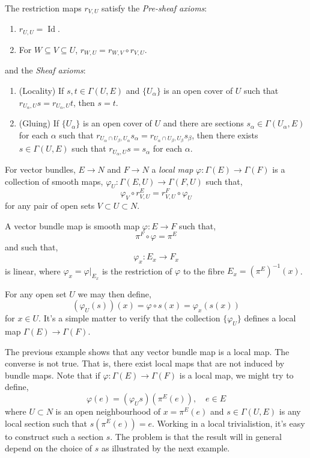 \documentclass{amsart}
\begin{document}
\begin{rem}
The restriction maps \(r_{V,U}\) satisfy the \emph{Pre-sheaf axioms}:
\begin{enumerate}
\item \(r_{U,U} = \operatorname{Id}\).
\item For \(W \subseteq V \subseteq U\), \(r_{W,U} = r_{W,V} \circ r_{V,U}\).
\end{enumerate}
and the \emph{Sheaf axioms}:
\begin{enumerate}
\item (Locality) If \(s, t \in \Gamma(U, E)\) and \(\{U_{\alpha}\}\) is an open cover of \(U\) such that \(r_{U_{\alpha},U} s = r_{U_{\alpha},U} t\), then \(s = t\).
\item (Gluing) If \(\{U_{\alpha}\}\) is an open cover of \(U\) and there are sections \(s_{\alpha} \in \Gamma(U_{\alpha}, E)\) for each \(\alpha\) such that \(r_{U_{\alpha} \cap U_{\beta},U_{\alpha}} s_{\alpha} = r_{U_{\alpha} \cap U_{\beta},U_{\beta}} s_{\beta}\), then there exists \(s \in \Gamma(U, E)\) such that \(r_{U_{\alpha},U} s = s_{\alpha}\) for each \(\alpha\).
\end{enumerate}
\end{rem}

\begin{defn}
For vector bundles, \(E \to N\) and \(F \to N\) a \emph{local map} \(\varphi : \Gamma(E) \to \Gamma(F)\) is a collection of smooth maps, \(\varphi_U : \Gamma(E, U) \to \Gamma(F, U)\) such that,
\[
\varphi_V \circ r^E_{V, U} = r^F_{V, U} \circ \varphi_U
\]
for any pair of open sets \(V \subset U \subset N\).
\end{defn}

\begin{example}
A vector bundle map is smooth map \(\varphi : E \to F\) such that,
\[
\pi^F \circ \varphi = \pi^E
\]
and such that,
\[
\varphi_x : E_x \to F_x
\]
is linear, where \(\varphi_x = \varphi|_{E_x}\) is the restriction of \(\varphi\) to the fibre \(E_x = (\pi^E)^{-1}(x)\).

For any open set \(U\) we may then define,
\[
(\varphi_U (s)) (x) = \varphi \circ s (x) = \varphi_x(s(x))
\]
for \(x \in U\). It's a simple matter to verify that the collection \(\{\varphi_U\}\) defines a local map \(\Gamma(E) \to \Gamma(F)\).
\end{example}

\begin{rem}
The previous example shows that any vector bundle map is a local map. The converse is not true. That is, there exist local maps that are not induced by bundle maps. Note that if \(\varphi : \Gamma(E) \to \Gamma(F)\) is a local map, we might try to define,
\[
\varphi(e) = (\varphi_U s) (\pi^E(e)), \quad e \in E
\]
where \(U \subset N\) is an open neighbourhood of \(x = \pi^E(e)\) and \(s \in \Gamma(U, E)\) is any local section such that \(s(\pi^E(e)) = e\). Working in a local trivialistion, it's easy to construct such a section \(s\). The problem is that the result will in general depend on the choice of \(s\) as illustrated by the next example.
\end{rem}
\end{document}
